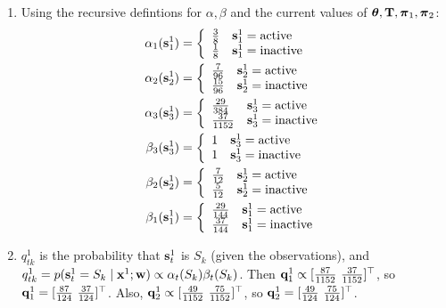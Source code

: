 \documentclass[12pt]{article}
\begin{document}
\begin{solution}
\begin{enumerate}
	\item Using the recursive defintions for $\alpha, \beta$ and the current values of $\boldsymbol{\theta}, \mathbf{T}, \boldsymbol{\pi}_1, \boldsymbol{\pi}_2$:
	\def\arraystretch{1.5}
	\begin{align*}
	\alpha_1(\mathbf{s}^1_1) &= \left\{
	\begin{array}{ll}
	\frac{3}{8} & \mathbf{s}^1_1 = \text{active} \\
	\frac{1}{8} & \mathbf{s}^1_1 = \text{inactive}
	\end{array} 
	\right.\\
	\alpha_2(\mathbf{s}^1_2) &= \left\{
	\begin{array}{ll}
	\frac{7}{96} & \mathbf{s}^1_2 = \text{active} \\
	\frac{15}{96} & \mathbf{s}^1_2 = \text{inactive}
	\end{array} 
	\right.\\
	\alpha_3(\mathbf{s}^1_3) &= \left\{
	\begin{array}{ll}
	\frac{29}{384} & \mathbf{s}^1_3 = \text{active} \\
	\frac{37}{1152} & \mathbf{s}^1_3 = \text{inactive}
	\end{array} 
	\right.\\
	\beta_3(\mathbf{s}^1_3) &= \left\{
	\begin{array}{ll}
	1 & \mathbf{s}^1_3 = \text{active} \\
	1 & \mathbf{s}^1_3 = \text{inactive}
	\end{array} 
	\right.\\
	\beta_2(\mathbf{s}^1_2) &= \left\{
	\begin{array}{ll}
	\frac{7}{12} & \mathbf{s}^1_2 = \text{active} \\
	\frac{5}{12} & \mathbf{s}^1_2 = \text{inactive}
	\end{array} 
	\right.\\
	\beta_1(\mathbf{s}^1_1) &= \left\{
	\begin{array}{ll}
	\frac{29}{144} & \mathbf{s}^1_1 = \text{active} \\
	\frac{37}{144} & \mathbf{s}^1_1 = \text{inactive}
	\end{array} 
	\right.
	\end{align*}
	\item $q^1_{tk}$ is the probability that $\mathbf{s}^1_t$ is $S_k$ (given the observations), and $q^1_{tk} = p(\mathbf{s}^1_t = S_k \mid \mathbf{x}^1; \mathbf{w}) \propto \alpha_t(S_k) \beta_t(S_k)$. Then $\mathbf{q}^1_1 \propto [\frac{87}{1152} \ \frac{37}{1152}]^\top$, so $\boldq^1_1 = [\frac{87}{124} \ \frac{37}{124}]^\top$. Also, $\boldq^1_2 \propto [\frac{49}{1152} \ \frac{75}{1152}]^\top$, so $\mathbf{q}^1_2 = [\frac{49}{124} \ \frac{75}{124}]^\top$.

\end{enumerate}
\end{solution}
\end{document}
